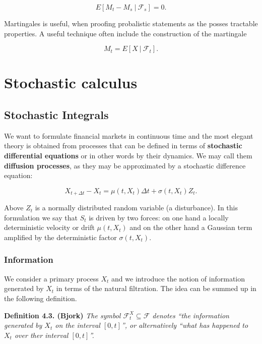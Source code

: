 \documentclass[a4paper,12pt,openany]{book}
\begin{document}
\[
E[M_t-M_s\ \vert\ \mathcal{F}_s]=0.
\]

Martingales is useful, when proofing probalistic statements as the posses tractable properties. A useful technique often include the construction of the martingale

\[
M_t=E[X\ \vert\ \mathcal{F}_t].
\]

\hypertarget{stochastic-calculus}{%
\chapter{Stochastic calculus}\label{stochastic-calculus}}

\hypertarget{stochastic-integrals}{%
\section{Stochastic Integrals}\label{stochastic-integrals}}

We want to formulate financial markets in continuous time and the most elegant theory is obtained from processes that can be defined in terms of \textbf{stochastic differential equations} or in other words by their dynamics. We may call them \textbf{diffusion processes}, as they may be approximated by a stochastic difference equation:

\[
X_{t+\Delta t}-X_t=\mu(t,X_t)\Delta t+\sigma(t,X_t)Z_t.\tag{4.1}
\]

Above \(Z_t\) is a normally distributed random variable (a disturbance). In this formulation we say that \(S_t\) is driven by two forces: on one hand a locally deterministic velocity or drift \(\mu(t,X_t)\) and on the other hand a Gaussian term amplified by the deterministic factor \(\sigma(t,X_t)\).

\hypertarget{information}{%
\subsection{Information}\label{information}}

We consider a primary process \(X_t\) and we introduce the notion of information generated by \(X_t\) in terms of the natural filtration. The idea can be summed up in the following definition.

\textbf{Definition 4.3. (Bjork)} \emph{The symbol \(\mathcal{F}^X_t\subseteq\mathcal{F}\) denotes ``the information generated by \(X_t\) on the interval \([0,t]\)'', or alternatively ``what has happened to \(X_t\) over ther interval \([0,t]\)''.}
\end{document}
